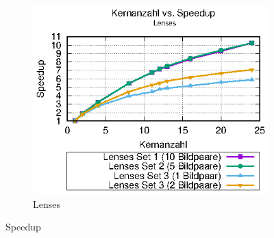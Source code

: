 \begin{center}
\begin{figure}[htbp]
\begin{subfigure}[b]{0.325\textwidth}
	\end{subfigure}
	\hfill
	\begin{subfigure}[b]{0.325\textwidth}
		\centering
		\includegraphics[width=\textwidth]{pdf/speedup_lenses}
		\caption[Lenses]{Lenses}
		\label{fig:speedup_lenses}
	\end{subfigure}
	\caption{Speedup}
\end{figure}
\end{center}

